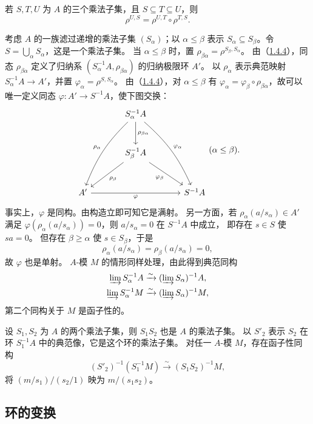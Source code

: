 若 $S,T,U$ 为 $A$ 的三个乘法子集，且 $S\subseteq T\subseteq U$，则
\[
 \rho^{U,S}=\rho^{U,T}\circ\rho^{T,S}.
\]

考虑 $A$ 的一族滤过递增的乘法子集 $(S_\alpha)$；以 $\alpha\le\beta$ 表示
$S_\alpha\subseteq S_\beta$。令 $S=\bigcup_\alpha S_\alpha$，这是一个乘法子集。
当 $\alpha\le\beta$ 时，置 $\rho_{\beta\alpha}=\rho^{S_\beta,S_\alpha}$。
由（\hyperlink{para:0:1.4.4}{1.4.4}），同态 $\rho_{\beta\alpha}$ 定义了归纳系
$(S_\alpha^{-1}A,\rho_{\beta\alpha})$ 的归纳极限环 $A'$。
以 $\rho_\alpha$ 表示典范映射 $S_\alpha^{-1}A\to A'$，并置
$\varphi_\alpha=\rho^{S,S_\alpha}$。
由（\hyperlink{para:0:1.4.4}{1.4.4}），对 $\alpha\le\beta$ 有
$\varphi_\alpha=\varphi_\beta\circ\rho_{\beta\alpha}$，故可以唯一定义同态
$\varphi\colon A'\to S^{-1}A$，使下图交换：
\[
\begin{tikzcd}[column sep=large,row sep=large]
& S_\alpha^{-1}A \arrow[d,"\rho_{\beta\alpha}"] \arrow[ddl,"\rho_\alpha"',bend right=12] \arrow[ddr,"\varphi_\alpha",bend left=12] &\\
& S_\beta^{-1}A \arrow[dl,"\rho_\beta"] \arrow[dr,"\varphi_\beta"'] &\\
A' \arrow[rr,"\varphi"'] && S^{-1}A
\end{tikzcd}
\qquad(\alpha\le\beta).
\]
事实上，$\varphi$ 是同构。由构造立即可知它是满射。
另一方面，若 $\rho_\alpha(a/s_\alpha)\in A'$ 满足
$\varphi(\rho_\alpha(a/s_\alpha))=0$，则 $a/s_\alpha=0$ 在 $S^{-1}A$ 中成立，
即存在 $s\in S$ 使 $sa=0$。
但存在 $\beta\ge\alpha$ 使 $s\in S_\beta$，于是
\[
 \rho_\alpha(a/s_\alpha)=\rho_\beta(a/s_\alpha)=0,
\]
故 $\varphi$ 也是单射。
$A$-模 $M$ 的情形同样处理，由此得到典范同构
\[
 \begin{aligned}
 \varinjlim S_\alpha^{-1}A&\xrightarrow{\sim}(\varinjlim S_\alpha)^{-1}A,\\
 \varinjlim S_\alpha^{-1}M&\xrightarrow{\sim}(\varinjlim S_\alpha)^{-1}M,
 \end{aligned}
\]
第二个同构关于 $M$ 是函子性的。

设 $S_1,S_2$ 为 $A$ 的两个乘法子集，则 $S_1S_2$ 也是 $A$ 的乘法子集。
以 $S'_2$ 表示 $S_2$ 在环 $S_1^{-1}A$ 中的典范像，它是这个环的乘法子集。
对任一 $A$-模 $M$，存在函子性同构
\[
 (S'_2)^{-1}(S_1^{-1}M)\xrightarrow{\sim}(S_1S_2)^{-1}M,
\]
将 $(m/s_1)/(s_2/1)$ 映为 $m/(s_1s_2)$。

\subsection{环的变换}\hypertarget{heading:0:1.5}{}

